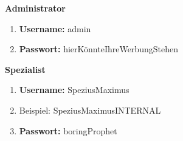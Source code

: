 \textbf{Administrator}
\begin{enumerate}
	\item{\textbf{Username:} admin}
	\item{\textbf{Passwort:} hierKönnteIhreWerbungStehen}
\end{enumerate}
\pagebreak
\textbf{Spezialist}
\begin{enumerate}
	\item{\textbf{Username:} SpeziusMaximus}
	\item[]{Beispiel: SpeziusMaximus\textunderscore{}INTERNAL}
	\item{\textbf{Passwort:} boringProphet}
\end{enumerate}
